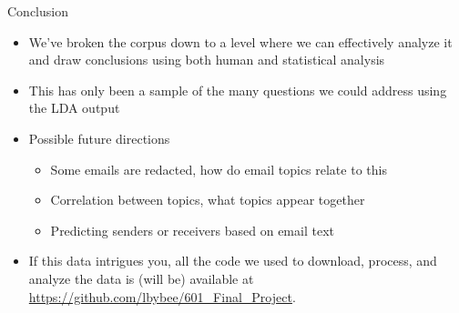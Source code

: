 \documentclass[handout,13pt]{beamer}
\begin{document}


\begin{frame}{Conclusion}
\begin{itemize}
\item We've broken the corpus down to a level where we can effectively analyze it and draw conclusions using both human and statistical analysis
\item This has only been a sample of the many questions we could address using the LDA output
\item Possible future directions
  \begin{itemize}
  \item Some emails are redacted, how do email topics relate to this
  \item Correlation between topics, what topics appear together
  \item Predicting senders or receivers based on email text
  \end{itemize}
\item If this data intrigues you, all the code we used to download, process, and analyze the data is (will be) available at \url{https://github.com/lbybee/601_Final_Project}.
\end{itemize}
\end{frame}
\end{document}
